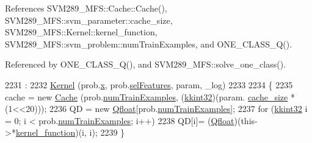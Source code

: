 References S\+V\+M289\+\_\+\+M\+F\+S\+::\+Cache\+::\+Cache(), S\+V\+M289\+\_\+\+M\+F\+S\+::svm\+\_\+parameter\+::cache\+\_\+size, S\+V\+M289\+\_\+\+M\+F\+S\+::\+Kernel\+::kernel\+\_\+function, S\+V\+M289\+\_\+\+M\+F\+S\+::svm\+\_\+problem\+::num\+Train\+Examples, and O\+N\+E\+\_\+\+C\+L\+A\+S\+S\+\_\+\+Q().



Referenced by O\+N\+E\+\_\+\+C\+L\+A\+S\+S\+\_\+\+Q(), and S\+V\+M289\+\_\+\+M\+F\+S\+::solve\+\_\+one\+\_\+class().


\begin{DoxyCode}
2231                 :
2232     \hyperlink{class_s_v_m289___m_f_s_1_1_kernel_adaef8fcc49a7eb9e702e9c61588f6306}{Kernel} (prob.\hyperlink{struct_s_v_m289___m_f_s_1_1svm__problem_a7bca932b51ca89f6820225e8e9c1bd35}{x}, prob.\hyperlink{struct_s_v_m289___m_f_s_1_1svm__problem_acb97fd041d0a35f90ce7e4a906ae2a17}{selFeatures}, param, \_log)
2233 
2234   \{
2235     cache = \textcolor{keyword}{new} \hyperlink{class_s_v_m289___m_f_s_1_1_cache}{Cache} (prob.\hyperlink{struct_s_v_m289___m_f_s_1_1svm__problem_a16d137e053c79776e064691a20fa80ee}{numTrainExamples}, (\hyperlink{namespace_k_k_b_a8fa4952cc84fda1de4bec1fbdd8d5b1b}{kkint32})(param.
      \hyperlink{struct_s_v_m289___m_f_s_1_1svm__parameter_a08f7b3453369bccdfe43fd9ea1f28241}{cache\_size} * (1<<20)));
2236     QD = \textcolor{keyword}{new} \hyperlink{namespace_s_v_m289___m_f_s_a440663a1b8d42bc10329401883645ae1}{Qfloat}[prob.\hyperlink{struct_s_v_m289___m_f_s_1_1svm__problem_a16d137e053c79776e064691a20fa80ee}{numTrainExamples}];
2237     \textcolor{keywordflow}{for}  (\hyperlink{namespace_k_k_b_a8fa4952cc84fda1de4bec1fbdd8d5b1b}{kkint32} i = 0;  i < prob.\hyperlink{struct_s_v_m289___m_f_s_1_1svm__problem_a16d137e053c79776e064691a20fa80ee}{numTrainExamples};  i++)
2238       QD[i]= (\hyperlink{namespace_s_v_m289___m_f_s_a440663a1b8d42bc10329401883645ae1}{Qfloat})(this->*\hyperlink{class_s_v_m289___m_f_s_1_1_kernel_aeefe3098d1eb72604d8d9d82c385e7bd}{kernel\_function})(i, i);
2239   \}
\end{DoxyCode}
